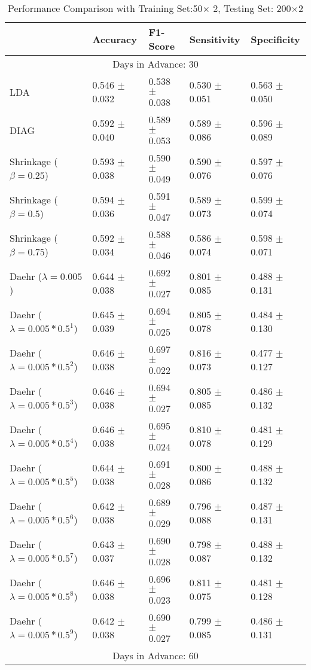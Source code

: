 \begin{table}
\caption{Performance Comparison with Training Set:50$\times$ 2, Testing Set: 200$\times$2}
\footnotesize
\centering
\begin{tabular}{*{5}{l}}
\toprule
 & Accuracy & F1-Score & Sensitivity & Specificity\\
\hline\multicolumn{5}{c}{  Days in Advance: 30}\\\hline
LDA&0.546 $\pm$ 0.032&0.538 $\pm$ 0.038&0.530 $\pm$ 0.051&0.563 $\pm$ 0.050\\
DIAG&0.592 $\pm$ 0.040&0.589 $\pm$ 0.053&0.589 $\pm$ 0.086&0.596 $\pm$ 0.089\\
Shrinkage ($\beta=0.25$)&0.593 $\pm$ 0.038&0.590 $\pm$ 0.049&0.590 $\pm$ 0.076&0.597 $\pm$ 0.076\\
Shrinkage ($\beta=0.5$)&0.594 $\pm$ 0.036&0.591 $\pm$ 0.047&0.589 $\pm$ 0.073&0.599 $\pm$ 0.074\\
Shrinkage ($\beta=0.75$)&0.592 $\pm$ 0.034&0.588 $\pm$ 0.046&0.586 $\pm$ 0.074&0.598 $\pm$ 0.071\\
Daehr ($\lambda=0.005$)&0.644 $\pm$ 0.038&0.692 $\pm$ 0.027&0.801 $\pm$ 0.085&0.488 $\pm$ 0.131\\
Daehr ($\lambda=0.005*0.5^1$)&0.645 $\pm$ 0.039&0.694 $\pm$ 0.025&0.805 $\pm$ 0.078&0.484 $\pm$ 0.130\\
Daehr ($\lambda=0.005*0.5^2$)&0.646 $\pm$ 0.038&0.697 $\pm$ 0.022&0.816 $\pm$ 0.073&0.477 $\pm$ 0.127\\
Daehr ($\lambda=0.005*0.5^3$)&0.646 $\pm$ 0.038&0.694 $\pm$ 0.027&0.805 $\pm$ 0.085&0.486 $\pm$ 0.132\\
Daehr ($\lambda=0.005*0.5^4$)&0.646 $\pm$ 0.038&0.695 $\pm$ 0.024&0.810 $\pm$ 0.078&0.481 $\pm$ 0.129\\
Daehr ($\lambda=0.005*0.5^5$)&0.644 $\pm$ 0.038&0.691 $\pm$ 0.028&0.800 $\pm$ 0.086&0.488 $\pm$ 0.132\\
Daehr ($\lambda=0.005*0.5^6$)&0.642 $\pm$ 0.038&0.689 $\pm$ 0.029&0.796 $\pm$ 0.088&0.487 $\pm$ 0.131\\
Daehr ($\lambda=0.005*0.5^7$)&0.643 $\pm$ 0.037&0.690 $\pm$ 0.028&0.798 $\pm$ 0.087&0.488 $\pm$ 0.132\\
Daehr ($\lambda=0.005*0.5^8$)&0.646 $\pm$ 0.038&0.696 $\pm$ 0.023&0.811 $\pm$ 0.075&0.481 $\pm$ 0.128\\
Daehr ($\lambda=0.005*0.5^9$)&0.642 $\pm$ 0.038&0.690 $\pm$ 0.027&0.799 $\pm$ 0.085&0.486 $\pm$ 0.131\\
\hline\multicolumn{5}{c}{  Days in Advance: 60}\\\hline

\end{tabular}
\end{table}
